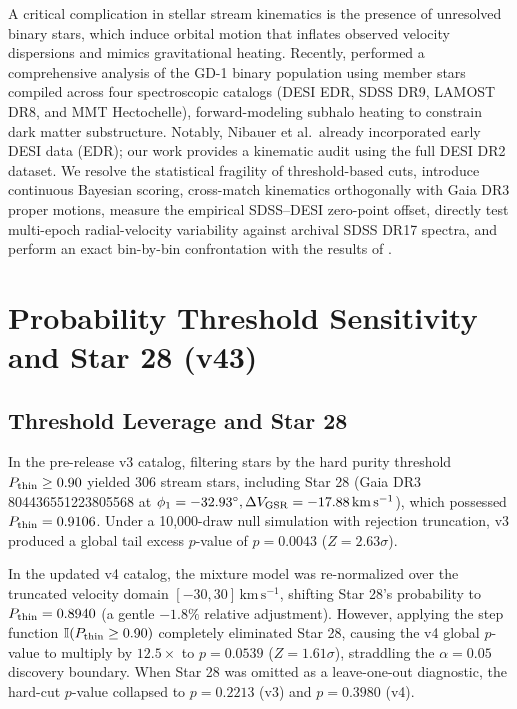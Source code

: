 \documentclass[twocolumn]{aastex631}
\begin{document}
A critical complication in stellar stream kinematics is the presence of unresolved binary stars, which induce orbital motion that inflates observed velocity dispersions and mimics gravitational heating. Recently, \citet{Nibauer2026} performed a comprehensive analysis of the GD-1 binary population using member stars compiled across four spectroscopic catalogs (DESI EDR, SDSS DR9, LAMOST DR8, and MMT Hectochelle), forward-modeling subhalo heating to constrain dark matter substructure. Notably, Nibauer et al.\ already incorporated early DESI data (EDR); our work provides a kinematic audit using the full DESI DR2 dataset. We resolve the statistical fragility of threshold-based cuts, introduce continuous Bayesian scoring, cross-match kinematics orthogonally with Gaia DR3 proper motions, measure the empirical SDSS--DESI zero-point offset, directly test multi-epoch radial-velocity variability against archival SDSS DR17 spectra, and perform an exact bin-by-bin confrontation with the results of \citet{Nibauer2026}.

\section{Probability Threshold Sensitivity and Star 28 (v43)}
\label{sec:v43}

\subsection{Threshold Leverage and Star 28}
In the pre-release v3 catalog, filtering stars by the hard purity threshold $P_{\rm thin} \ge 0.90$ yielded 306 stream stars, including Star 28 (Gaia DR3 804436551223805568 at $\phi_1 = -32.93^\circ, \Delta V_{\rm GSR} = -17.88\,\mathrm{km\,s^{-1}}$), which possessed $P_{\rm thin} = 0.9106$. Under a 10,000-draw null simulation with rejection truncation, v3 produced a global tail excess $p$-value of $p = 0.0043$ ($Z = 2.63\sigma$).

In the updated v4 catalog, the mixture model was re-normalized over the truncated velocity domain $[-30, 30]\,\mathrm{km\,s^{-1}}$, shifting Star 28's probability to $P_{\rm thin} = 0.8940$ (a gentle $-1.8\%$ relative adjustment). However, applying the step function $\mathbb{I}(P_{\rm thin} \ge 0.90)$ completely eliminated Star 28, causing the v4 global $p$-value to multiply by $12.5\times$ to $p = 0.0539$ ($Z = 1.61\sigma$), straddling the $\alpha = 0.05$ discovery boundary. When Star 28 was omitted as a leave-one-out diagnostic, the hard-cut $p$-value collapsed to $p = 0.2213$ (v3) and $p = 0.3980$ (v4).
\end{document}
